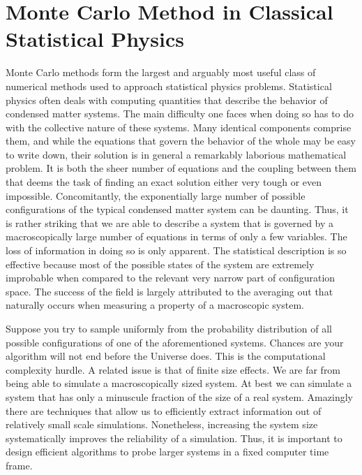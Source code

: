 \section{Monte Carlo Method in Classical  Statistical Physics}
\label{sec:classical_mc}

Monte Carlo methods form the largest and arguably most useful class of numerical methods used to approach statistical physics problems.
Statistical physics often deals with computing quantities that describe the behavior of condensed matter systems.
The main difficulty one faces when doing so has to do with the collective nature of these systems.
Many identical components comprise them, and while the equations that govern the behavior of the whole may be easy to write down, their solution is in general a remarkably laborious mathematical problem.
It is both the sheer number of equations and the coupling between them that deems the task of finding an exact solution either very tough or even impossible.
Concomitantly, the exponentially large number of possible configurations of the typical condensed matter system can be daunting.
Thus, it is rather striking that we are able to describe a system that is governed by a macroscopically large number of equations in terms of only a few variables.
The loss of information in doing so is only apparent.
The statistical description is so effective because most of the possible states of the system are extremely improbable when compared to the relevant very narrow part of configuration space.
The success of the field is largely attributed to the averaging out that naturally occurs when measuring a property of a macroscopic system.

Suppose you try to sample uniformly from the probability distribution of all possible configurations of one of the aforementioned systems.
Chances are your algorithm will not end before the Universe does.
This is the computational complexity hurdle.
A related issue is that of finite size effects.
We are far from being able to simulate a macroscopically sized system. 
At best we can simulate a system that has only a minuscule fraction of the size of a real system.
Amazingly there are techniques that allow us to efficiently extract information out of relatively small scale simulations.
Nonetheless, increasing the system size systematically improves the reliability of a simulation.
Thus, it is important to design efficient algorithms to probe larger systems in a fixed computer time frame.

